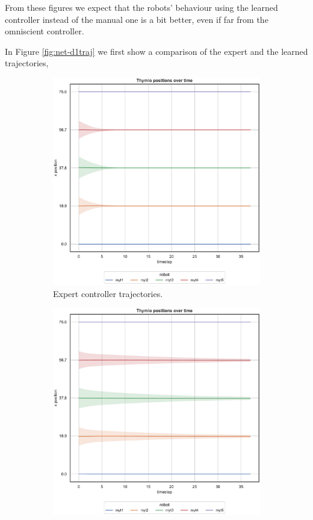From these figures we expect that the robots' behaviour using the learned 
controller instead of the manual one is a bit better, even if far from the omniscient 
controller.

In Figure \ref{fig:net-d1traj} we first show a comparison of the expert and the 
learned trajectories, 
\begin{figure}[!htb]
	\begin{center}
		\begin{subfigure}[h]{0.49\textwidth}
			\centering
			\includegraphics[width=.9\textwidth]{contents/images/net-d1/position-overtime-omniscient}%
			\caption{Expert controller trajectories.}
		\end{subfigure}
		\hfill
		\begin{subfigure}[h]{0.49\textwidth}
			\centering
			\includegraphics[width=.9\textwidth]{contents/images/net-d1/position-overtime-learned_distributed}

\end{subfigure}
\end{center}
\end{figure}
